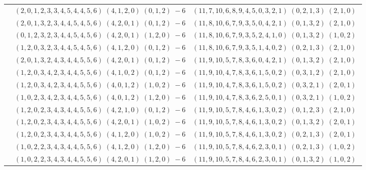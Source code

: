 \documentclass[11pt]{article}
\begin{document}
\begin{longtable}[l]{|c|c|c|}
 \cline{2-3} 
 & $(2 ,0 ,1 ,2 ,3 ,3 ,4 ,5 ,4 ,4 ,5 ,6) \;(4 ,1 ,2 ,0) \;(0 ,1 ,2) \;-6$ & $(11 ,7 ,10 ,6 ,8 ,9 ,4 ,5 ,0 ,3 ,2 ,1) \;(0 ,2 ,1 ,3) \;(2 ,1 ,0) \;$\\ 
 \cline{2-3} 
 & $(2 ,0 ,1 ,3 ,2 ,3 ,4 ,4 ,5 ,4 ,5 ,6) \;(4 ,2 ,0 ,1) \;(0 ,1 ,2) \;-6$ & $(11 ,8 ,10 ,6 ,7 ,9 ,3 ,5 ,0 ,4 ,2 ,1) \;(0 ,1 ,3 ,2) \;(2 ,1 ,0) \;$\\ 
 \cline{2-3} 
 & $(0 ,1 ,2 ,3 ,2 ,3 ,4 ,4 ,5 ,4 ,5 ,6) \;(4 ,2 ,0 ,1) \;(1 ,2 ,0) \;-6$ & $(11 ,8 ,10 ,6 ,7 ,9 ,3 ,5 ,2 ,4 ,1 ,0) \;(0 ,1 ,3 ,2) \;(1 ,0 ,2) \;$\\ 
 \cline{2-3} 
 & $(1 ,2 ,0 ,3 ,2 ,3 ,4 ,4 ,5 ,4 ,5 ,6) \;(4 ,1 ,2 ,0) \;(0 ,1 ,2) \;-6$ & $(11 ,8 ,10 ,6 ,7 ,9 ,3 ,5 ,1 ,4 ,0 ,2) \;(0 ,2 ,1 ,3) \;(2 ,1 ,0) \;$\\ 
 \cline{2-3} 
 & $(2 ,0 ,1 ,3 ,2 ,4 ,3 ,4 ,4 ,5 ,5 ,6) \;(4 ,2 ,0 ,1) \;(0 ,1 ,2) \;-6$ & $(11 ,9 ,10 ,5 ,7 ,8 ,3 ,6 ,0 ,4 ,2 ,1) \;(0 ,1 ,3 ,2) \;(2 ,1 ,0) \;$\\ 
 \cline{2-3} 
 & $(1 ,2 ,0 ,3 ,4 ,2 ,3 ,4 ,4 ,5 ,5 ,6) \;(4 ,1 ,0 ,2) \;(0 ,1 ,2) \;-6$ & $(11 ,9 ,10 ,4 ,7 ,8 ,3 ,6 ,1 ,5 ,0 ,2) \;(0 ,3 ,1 ,2) \;(2 ,1 ,0) \;$\\ 
 \cline{2-3} 
 & $(1 ,2 ,0 ,3 ,4 ,2 ,3 ,4 ,4 ,5 ,5 ,6) \;(4 ,0 ,1 ,2) \;(1 ,0 ,2) \;-6$ & $(11 ,9 ,10 ,4 ,7 ,8 ,3 ,6 ,1 ,5 ,0 ,2) \;(0 ,3 ,2 ,1) \;(2 ,0 ,1) \;$\\ 
 \cline{2-3} 
 & $(1 ,0 ,2 ,3 ,4 ,2 ,3 ,4 ,4 ,5 ,5 ,6) \;(4 ,0 ,1 ,2) \;(1 ,2 ,0) \;-6$ & $(11 ,9 ,10 ,4 ,7 ,8 ,3 ,6 ,2 ,5 ,0 ,1) \;(0 ,3 ,2 ,1) \;(1 ,0 ,2) \;$\\ 
 \cline{2-3} 
 & $(1 ,2 ,0 ,2 ,3 ,4 ,3 ,4 ,4 ,5 ,5 ,6) \;(4 ,2 ,1 ,0) \;(0 ,1 ,2) \;-6$ & $(11 ,9 ,10 ,5 ,7 ,8 ,4 ,6 ,1 ,3 ,0 ,2) \;(0 ,1 ,2 ,3) \;(2 ,1 ,0) \;$\\ 
 \cline{2-3} 
 & $(1 ,2 ,0 ,2 ,3 ,4 ,3 ,4 ,4 ,5 ,5 ,6) \;(4 ,2 ,0 ,1) \;(1 ,0 ,2) \;-6$ & $(11 ,9 ,10 ,5 ,7 ,8 ,4 ,6 ,1 ,3 ,0 ,2) \;(0 ,1 ,3 ,2) \;(2 ,0 ,1) \;$\\ 
 \cline{2-3} 
 & $(1 ,2 ,0 ,2 ,3 ,4 ,3 ,4 ,4 ,5 ,5 ,6) \;(4 ,1 ,2 ,0) \;(1 ,0 ,2) \;-6$ & $(11 ,9 ,10 ,5 ,7 ,8 ,4 ,6 ,1 ,3 ,0 ,2) \;(0 ,2 ,1 ,3) \;(2 ,0 ,1) \;$\\ 
 \cline{2-3} 
 & $(1 ,0 ,2 ,2 ,3 ,4 ,3 ,4 ,4 ,5 ,5 ,6) \;(4 ,1 ,2 ,0) \;(1 ,2 ,0) \;-6$ & $(11 ,9 ,10 ,5 ,7 ,8 ,4 ,6 ,2 ,3 ,0 ,1) \;(0 ,2 ,1 ,3) \;(1 ,0 ,2) \;$\\ 
 \cline{2-3} 
 & $(1 ,0 ,2 ,2 ,3 ,4 ,3 ,4 ,4 ,5 ,5 ,6) \;(4 ,2 ,0 ,1) \;(1 ,2 ,0) \;-6$ & $(11 ,9 ,10 ,5 ,7 ,8 ,4 ,6 ,2 ,3 ,0 ,1) \;(0 ,1 ,3 ,2) \;(1 ,0 ,2) \;$\\ 

\end{longtable}
\end{document}
